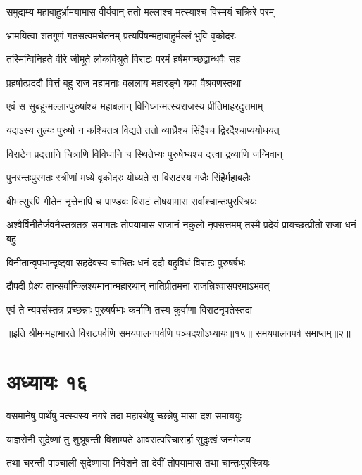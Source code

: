\twolineshloka
{समुद्यम्य महाबाहुर्भ्रामयामास वीर्यवान्}
{ततो मल्लाश्च मत्स्याश्च विस्मयं चक्रिरे परम्}


\twolineshloka
{भ्रामयित्वा शतगुणं गतसत्वमचेतनम्}
{प्रत्यपिंषन्महाबाहुर्मल्लं भुवि वृकोदरः}


\twolineshloka
{तस्मिन्विनिहते वीरे जीमूते लोकविश्रुते}
{विराटः परमं हर्षमगच्छद्वान्धवैः सह}


\twolineshloka
{प्रहर्षात्प्रददौ वित्तं बहु राज महामनाः}
{वललाय महारङ्गे यथा वैश्रवणस्तथा}


\twolineshloka
{एवं स सुबहून्मल्लान्पुरुषांश्च महाबलान्}
{विनिघ्नन्मत्स्यराजस्य प्रीतिमाहरदुत्तमाम्}


\twolineshloka
{यदाऽस्य तुल्यः पुरुषो न कश्चितत्र विद्यते}
{ततो व्याघ्रैश्च सिंहैश्च द्विरदैश्चाप्ययोधयत्}


\twolineshloka
{विराटेन प्रदत्तानि चित्राणि विविधानि च}
{स्थितेभ्यः पुरुषेभ्यश्च दत्त्वा द्रव्याणि जग्मिवान्}


\twolineshloka
{पुनरन्तःपुरगतः स्त्रीणां मध्ये वृकोदरः}
{योध्यते स विराटस्य गजैः सिंहैर्महाबलैः}


\twolineshloka
{बीभत्सुरपि गीतेन नृत्तेनापि च पाण्डवः}
{विराटं तोषयामास सर्वाश्चान्तःपुरस्त्रियः}


\threelineshloka
{अश्वैर्विनीतैर्जवनैस्तत्रतत्र समागतः}
{तोपयामास राजानं नकुलो नृपसत्तमम्}
{तस्मै प्रदेयं प्रायच्छत्प्रीतो राजा धनं बहु}


\twolineshloka
{विनीतान्वृपभान्दृष्ट्वा सहदेवस्य चाभितः}
{धनं ददौ बहुविधं विराटः पुरुषर्षभः}


\twolineshloka
{द्रौपदी प्रेक्ष्य तान्सर्वान्क्लिश्यमानान्महारथान्}
{नातिप्रीतमना राजन्निश्वासपरमाऽभवत्}


\twolineshloka
{एवं ते न्यवसंस्तत्र प्रच्छन्नाः पुरुषर्षभाः}
{कर्माणि तस्य कुर्वाणा विराटनृपतेस्तदा}

॥इति श्रीमन्महाभारते विराटपर्वणि समयपालनपर्वणि पञ्चदशोऽध्यायः॥१५॥ समयपालनपर्व समाप्तम्॥२॥

\chapter{अध्यायः १६}

\twolineshloka
{वसमानेषु पार्थेषु मत्स्यस्य नगरे तदा}
{महारथेषु च्छन्नेषु मासा दश समाययुः}


\twolineshloka
{याज्ञसेनी सुदेष्णां तु शुश्रूषन्ती विशाम्पते}
{आवसत्परिचारार्हा सुदुःखं जनमेजय}


\twolineshloka
{तथा चरन्ती पाञ्चाली सुदेष्णाया निवेशने}
{ता देवीं तोपयामास तथा चान्तःपुरस्त्रियः}


